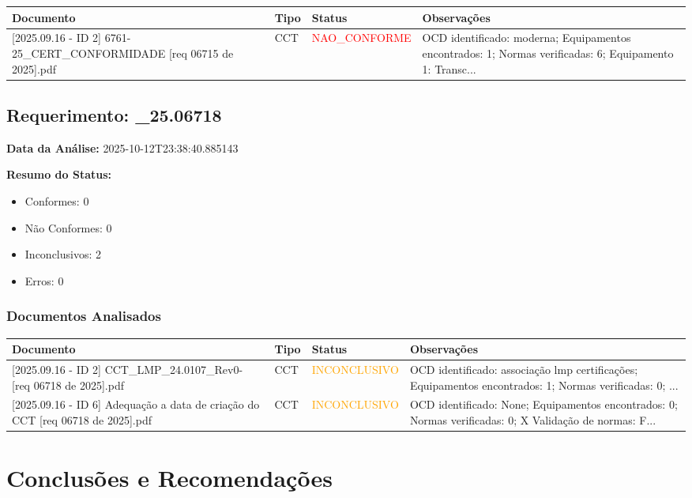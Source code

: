 \documentclass[12pt,a4paper]{article}
\begin{document}
\begin{longtable}{|p{4cm}|p{2cm}|p{2cm}|p{6cm}|}
\hline
\textbf{Documento} & \textbf{Tipo} & \textbf{Status} & \textbf{Observações} \\
\hline
\endhead
[Certificado de Conformidade Técnica - CCT][2025.09.16 - ID 2] 6761-25\_CERT\_CONFORMIDADE [req 06715 de  2025].pdf & CCT & \textcolor{red}{NAO\_CONFORME} & OCD identificado: moderna; Equipamentos encontrados: 1; Normas verificadas: 6; Equipamento 1: Transc... \\
\hline
\end{longtable}


\subsection{Requerimento: \_25.06718}

\textbf{Data da Análise:} 2025-10-12T23:38:40.885143

\textbf{Resumo do Status:}
\begin{itemize}
    \item Conformes: 0
    \item Não Conformes: 0
    \item Inconclusivos: 2
    \item Erros: 0
\end{itemize}

\subsubsection{Documentos Analisados}

\begin{longtable}{|p{4cm}|p{2cm}|p{2cm}|p{6cm}|}
\hline
\textbf{Documento} & \textbf{Tipo} & \textbf{Status} & \textbf{Observações} \\
\hline
\endhead
[Certificado de Conformidade Técnica - CCT][2025.09.16 - ID 2] CCT\_LMP\_24.0107\_Rev0- [req 06718 de  2025].pdf & CCT & \textcolor{orange}{INCONCLUSIVO} & OCD identificado: associação lmp certificações; Equipamentos encontrados: 1; Normas verificadas: 0; ... \\
\hline
[Outros (OCD)][2025.09.16 - ID 6] Adequação a data de criação do CCT [req 06718 de  2025].pdf & CCT & \textcolor{orange}{INCONCLUSIVO} & OCD identificado: None; Equipamentos encontrados: 0; Normas verificadas: 0; X Validação de normas: F... \\
\hline
\end{longtable}


\section{Conclus\~oes e Recomenda\c{c}\~oes}
\end{document}
